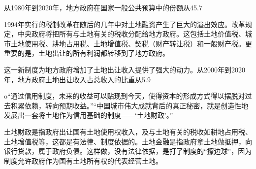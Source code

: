 从1980年到2020年，地方政府在国家一般公共预算中的份额从45.7%

1994年实行的税制改革在随后的几年中对土地融资产生了巨大的溢出效应。改革规定，中央政府将把所有与土地有关的税收分配给地方政府。这包括土地价值税、城市土地使用税、耕地占用税、土地增值税、契税（财产转让税）和一般财产税。更重要的是，土地出让的所有利润都转移到了地方政府。

这一新制度为地方政府增加了土地出让收入提供了强大的动力。从2000年到2020年，地方政府土地出让收入占总收入的比重从5.9%

o“通过信用制度，未来的收益可以贴现到今天，使得资本的形成方式得以摆脱对过去积累依赖，转向预期收益。”“中国城市伟大成就背后的真正秘密，就是创造性地发展出一套将土地作为信用基础的制度——‘土地财政’。”


土地财政是指政府出让国有土地使用权收入，及与土地有关的税收如耕地占用税、土地增值税等，这都是有法律、制度依据的。土地金融是指政府拿土地做抵押，向银行贷款，属于政府负债。这样做，没有法律依据，是打了制度的“擦边球”，因为制度允许政府作为国有土地所有权的代表经营土地。
